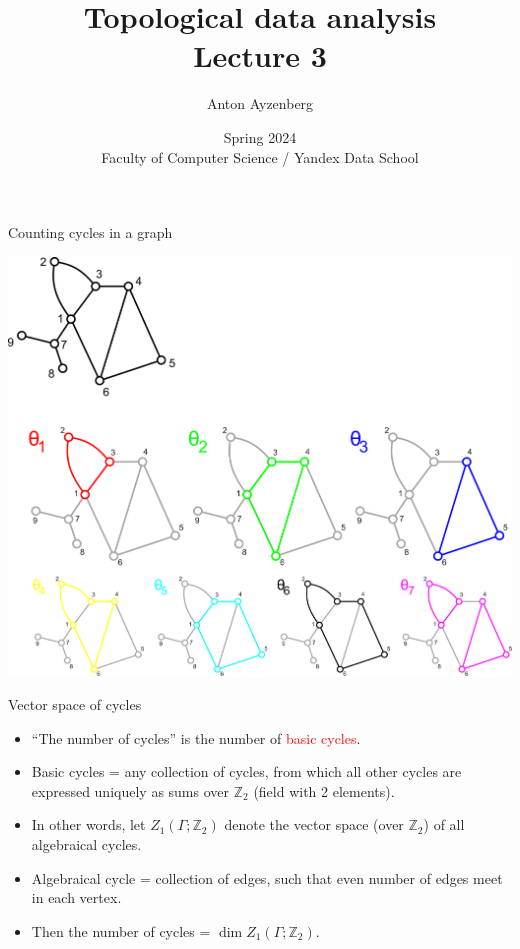 \documentclass[10pt]{beamer}
\title[Topology intro]{Topological data analysis \\ Lecture 3}
\author[Anton Ayzenberg]{ Anton Ayzenberg }%
\date[FCS-YDS'24]{Spring 2024 \\ Faculty of Computer Science / Yandex Data School}
\institute[ATA \& Noeon Research]{ATA Lab, FCS NRU HSE \\ Noeon Research}
\newcommand{\Zo}{\mathbb{Z}}
\newcommand{\Zt}{\Zo_2}
\begin{document}
\maketitle



\begin{frame}{Counting cycles in a graph}

\begin{center}
\includegraphics[scale=0.12]{pictures/graphcycles.pdf}
\end{center}

\end{frame}

\begin{frame}{Vector space of cycles}

\begin{itemize}
  \item ``The number of cycles'' is the number of \textcolor{red}{basic cycles}.
  \item Basic cycles = any collection of cycles, from which all other cycles are expressed uniquely as sums over $\Zt$ (field with 2 elements).
  \item In other words, let $Z_1(\Gamma;\Zt)$ denote the vector space (over $\Zt$) of all algebraical cycles.
  \item Algebraical cycle = collection of edges, such that even number of edges meet in each vertex.
  \item Then the number of cycles = $\dim Z_1(\Gamma;\Zt)$.
\end{itemize}

\end{frame}
\end{document}
